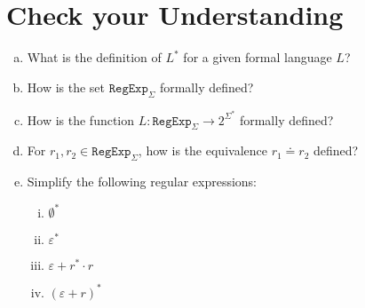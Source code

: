 \section{Check your Understanding}
\begin{enumerate}[(a)]
\item What is the definition of $ L^* $ for a given formal language $ L $?
\item How is the set $ \texttt{RegExp}_\Sigma $ formally defined?
\item How is the function $ L: \texttt{RegExp}_\Sigma \rightarrow 2^{\Sigma^*} $ formally defined?
\item For $ r_1, r_2 \in \texttt{RegExp}_\Sigma $, how is the equivalence $ r_1 \doteq r_2 $ defined?
\item Simplify the following regular expressions:
  \begin{enumerate}[i.]
  \item $\emptyset^*$
  \item $\varepsilon^*$
  \item $\varepsilon + r^* \cdot r$
  \item $(\varepsilon + r)^*$
  \end{enumerate}
\end{enumerate}




